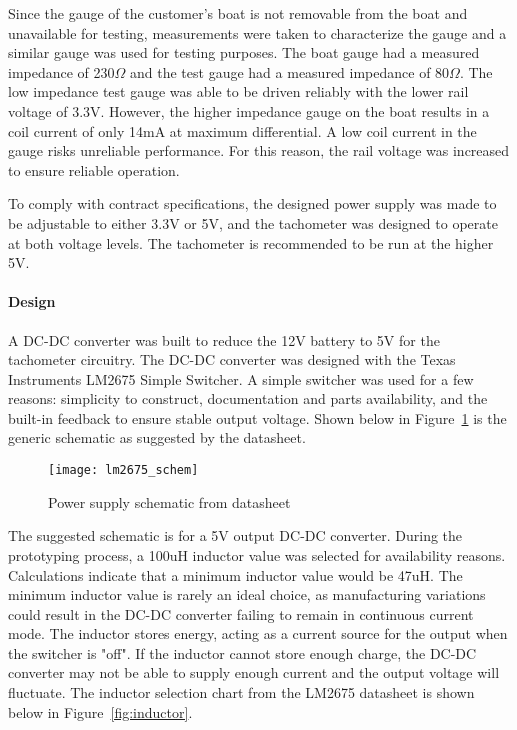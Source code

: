 Since the gauge of the customer's boat is not removable from the boat and unavailable for testing, measurements were taken to characterize the gauge and a similar gauge was used for testing purposes. The boat gauge had a measured impedance of 230$\Omega$ and the test gauge had a measured impedance of 80$\Omega$. The low impedance test gauge was able to be driven reliably with the lower rail voltage of 3.3V. However, the higher impedance gauge on the boat results in a coil current of only 14mA at maximum differential. A low coil current in the gauge risks unreliable performance. For this reason, the rail voltage was increased to ensure reliable operation.

To comply with contract specifications, the designed power supply was made to be adjustable to either 3.3V or 5V, and the tachometer was designed to operate at both voltage levels. The tachometer is recommended to be run at the higher 5V.

\paragraph{Design}
A DC-DC converter was built to reduce the 12V battery to 5V for the tachometer circuitry. The DC-DC converter was designed with the Texas Instruments LM2675 Simple Switcher. A simple switcher was used for a few reasons: simplicity to construct, documentation and parts availability, and the built-in feedback to ensure stable output voltage. Shown below in Figure~\ref{fig:lm2675_ps} is the generic schematic as suggested by the datasheet. 

\begin{figure}[H]
    \centering
    \texttt{[image: lm2675\_schem]}
    \caption{Power supply schematic from datasheet~\cite{lm2675}}
    \label{fig:lm2675_ps}
\end{figure}

The suggested schematic is for a 5V output DC-DC converter. During the prototyping process, a 100uH inductor value was selected for availability reasons. Calculations indicate that a minimum inductor value would be 47uH. The minimum inductor value is rarely an ideal choice, as manufacturing variations could result in the DC-DC converter failing to remain in continuous current mode. The inductor stores energy, acting as a current source for the output when the switcher is "off". If the inductor cannot store enough charge, the DC-DC converter may not be able to supply enough current and the output voltage will fluctuate. The inductor selection chart from the LM2675 datasheet is shown below in Figure~\ref{fig:inductor}.

